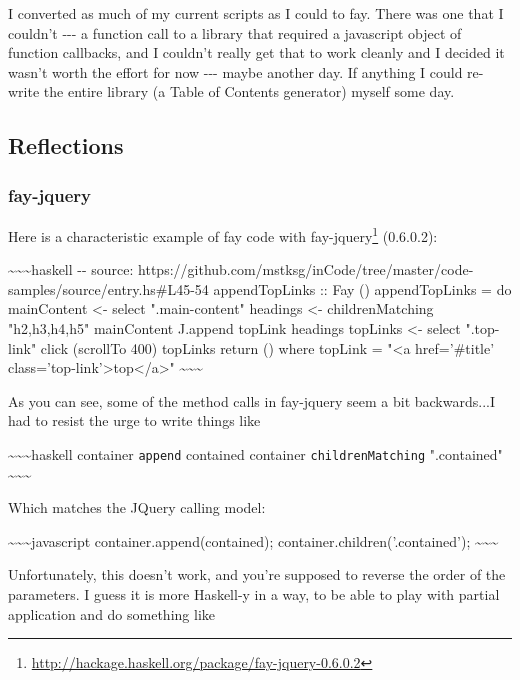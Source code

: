 \documentclass[]{article}
\renewcommand{\href}[2]{#2\footnote{\url{#1}}}
\begin{document}
I converted as much of my current scripts as I could to fay. There was one that
I couldn't -\/-\/- a function call to a library that required a javascript
object of function callbacks, and I couldn't really get that to work cleanly and
I decided it wasn't worth the effort for now -\/-\/- maybe another day. If
anything I could re-write the entire library (a Table of Contents generator)
myself some day.

\subsection{Reflections}

\subsubsection{fay-jquery}

Here is a characteristic example of fay code with
\href{http://hackage.haskell.org/package/fay-jquery-0.6.0.2}{fay-jquery}
(0.6.0.2):

\textasciitilde{}\textasciitilde{}\textasciitilde{}haskell -\/- source:
https://github.com/mstksg/inCode/tree/master/code-samples/source/entry.hs\#L45-54
appendTopLinks :: Fay () appendTopLinks = do mainContent \textless{}- select
".main-content" headings \textless{}- childrenMatching "h2,h3,h4,h5" mainContent
J.append topLink headings topLinks \textless{}- select ".top-link" click
(scrollTo 400) topLinks return () where topLink = "\textless{}a href='\#title'
class='top-link'\textgreater{}top\textless{}/a\textgreater{}"
\textasciitilde{}\textasciitilde{}\textasciitilde{}

As you can see, some of the method calls in fay-jquery seem a bit backwards...I
had to resist the urge to write things like

\textasciitilde{}\textasciitilde{}\textasciitilde{}haskell container
\texttt{append} contained container \texttt{childrenMatching} ".contained"
\textasciitilde{}\textasciitilde{}\textasciitilde{}

Which matches the JQuery calling model:

\textasciitilde{}\textasciitilde{}\textasciitilde{}javascript
container.append(contained); container.children('.contained');
\textasciitilde{}\textasciitilde{}\textasciitilde{}

Unfortunately, this doesn't work, and you're supposed to reverse the order of
the parameters. I guess it is more Haskell-y in a way, to be able to play with
partial application and do something like
\end{document}
